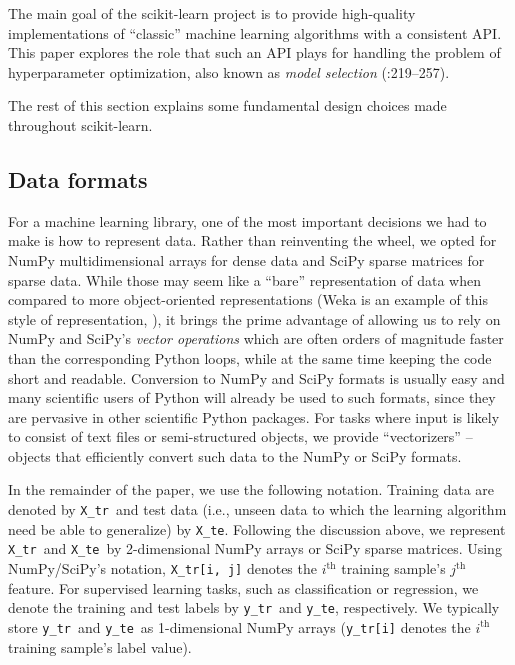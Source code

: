 \documentclass[a4paper,twocolumn]{article}
\newcommand{\Xtr}{\texttt{X\_tr}}
\newcommand{\Xte}{\texttt{X\_te}}
\newcommand{\ytr}{\texttt{y\_tr}}
\newcommand{\yte}{\texttt{y\_te}}
\begin{document}
The main goal of the scikit-learn project
is to provide high-quality implementations
of ``classic'' machine learning algorithms
with a consistent API.
This paper explores the role that such an API plays
for handling the problem of hyperparameter optimization,
also known as \textit{model selection} (\citealp{elemstatlearn}:219--257).

The rest of this section explains some fundamental design choices
made throughout scikit-learn.

\subsection{Data formats}

For a machine learning library, one of the most important decisions we had to
make is how to represent data.  Rather than reinventing the wheel, we opted for
NumPy multidimensional arrays  for dense data and SciPy
sparse matrices for sparse data.  While those may seem like a ``bare''
representation of data when compared to more object-oriented representations
(Weka is an example of this style of representation, \citealp{hall2009weka}),
it brings the prime advantage of allowing us to rely on NumPy and SciPy's
\textit{vector operations} which are often orders of magnitude faster
than the corresponding Python loops,
while at the same time keeping the code short and readable.
Conversion to NumPy and SciPy formats is usually easy and many scientific users
of Python will already be used to such formats, since they are pervasive in
other scientific Python packages.  For tasks where input is likely to consist
of text files or semi-structured objects, we provide ``vectorizers'' -- objects
that efficiently convert such data to the NumPy or SciPy formats.

In the remainder of the paper, we use the following notation. Training data are
denoted by \Xtr ~and test data (i.e., unseen data to which the learning
algorithm need be able to generalize) by \Xte.  Following the discussion above,
we represent \Xtr ~and \Xte ~by 2-dimensional NumPy arrays or SciPy sparse
matrices. Using NumPy/SciPy's notation, \Xtr\texttt{[i, j]} denotes the
$i^\textrm{th}$ training sample's $j^\textrm{th}$ feature. For supervised learning tasks,
such as classification or regression, we denote the training and test labels by
\ytr ~and \yte, respectively. We typically store \ytr ~and \yte ~as
1-dimensional NumPy arrays (\ytr\texttt{[i]} denotes the $i^\textrm{th}$ training
sample's label value).
\end{document}
